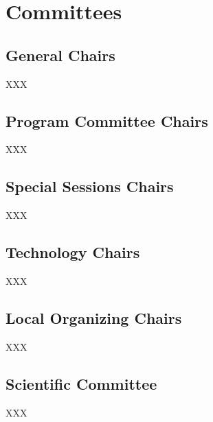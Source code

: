 \chapter{Committees}
\section{General Chairs}
XXX

\section{Program Committee Chairs}
XXX

\section{Special Sessions Chairs}
XXX
    
\section {Technology Chairs}
XXX

\section{Local Organizing Chairs}
XXX
    
\section{Scientific Committee}
XXX
